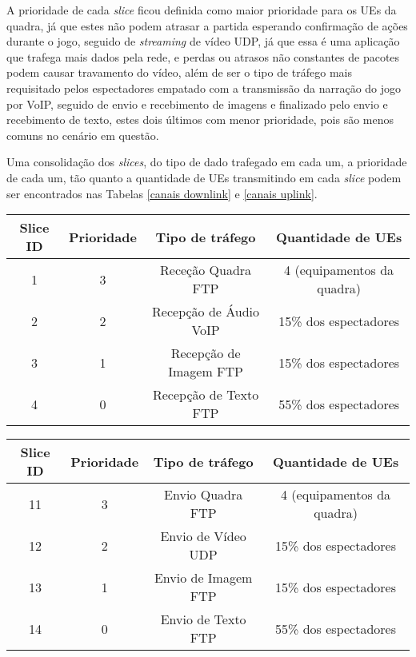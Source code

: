 \documentclass[11pt,twoside]{article}
\begin{document}
	A prioridade de cada \textit{slice} ficou definida como maior prioridade para os UEs da quadra, já que estes não podem atrasar a partida esperando confirmação de ações durante o jogo, seguido de \textit{streaming} de vídeo UDP, já que essa é uma aplicação que trafega mais dados pela rede, e perdas ou atrasos não constantes de pacotes podem causar travamento do vídeo, além de ser o tipo de tráfego mais requisitado pelos espectadores empatado com a transmissão da narração do jogo por VoIP, seguido de envio e recebimento de imagens e finalizado pelo envio e recebimento de texto, estes dois últimos com menor prioridade, pois são menos comuns no cenário em questão.
	
	Uma consolidação dos \textit{slices}, do tipo de dado trafegado em cada um, a prioridade de cada um, tão quanto a quantidade de UEs transmitindo em cada \textit{slice} podem ser encontrados nas Tabelas \ref{canais downlink} e \ref{canais uplink}. 
	
	\begin{table*}[!htb]
		\setlength{\tabcolsep}{5mm}
		\centering
		\begin{tabular}{c|c|c|c}
			\toprule
			Slice ID & Prioridade & Tipo de tráfego & Quantidade de UEs 
			\\
			\midrule
			1 & 3 & Receção Quadra FTP & 4 (equipamentos da quadra)
			\\
			2 & 2 & Recepção de Áudio VoIP & 15\% dos espectadores
			\\
			3 & 1 & Recepção de Imagem FTP & 15\% dos espectadores
			\\
			4 & 0 & Recepção de Texto FTP & 55\% dos espectadores
			\\
			\bottomrule
		\end{tabular}
		\caption{Slices de Downlink e UEs na rede}
		\label{canais downlink}
	\end{table*}
	
	\begin{table*}[!htb]
		\setlength{\tabcolsep}{5mm}
		\centering
		\begin{tabular}{c|c|c|c}
			\toprule
			Slice ID & Prioridade & Tipo de tráfego & Quantidade de UEs 
			\\
			\midrule
			11 & 3 & Envio Quadra FTP & 4 (equipamentos da quadra)
			\\
			12 & 2 & Envio de Vídeo UDP & 15\% dos espectadores
			\\
			13 & 1 & Envio de Imagem FTP & 15\% dos espectadores
			\\
			14 & 0 & Envio de Texto FTP & 55\% dos espectadores
			\\
			\bottomrule
		\end{tabular}
		\caption{Slices de Uplink e UEs na rede}
		\label{canais uplink}
	\end{table*}
\end{document}
